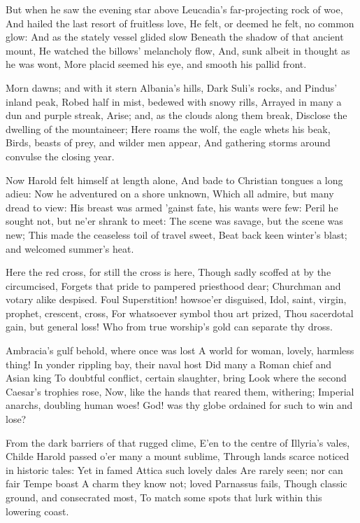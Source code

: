 \documentclass[10pt,twocolumn]{book}
\begin{document}
   But when he saw the evening star above
   Leucadia's far-projecting rock of woe,
   And hailed the last resort of fruitless love,
   He felt, or deemed he felt, no common glow:
   And as the stately vessel glided slow
   Beneath the shadow of that ancient mount,
   He watched the billows' melancholy flow,
   And, sunk albeit in thought as he was wont,
More placid seemed his eye, and smooth his pallid front.


   Morn dawns; and with it stern Albania's hills,
   Dark Suli's rocks, and Pindus' inland peak,
   Robed half in mist, bedewed with snowy rills,
   Arrayed in many a dun and purple streak,
   Arise; and, as the clouds along them break,
   Disclose the dwelling of the mountaineer;
   Here roams the wolf, the eagle whets his beak,
   Birds, beasts of prey, and wilder men appear,
And gathering storms around convulse the closing year.


   Now Harold felt himself at length alone,
   And bade to Christian tongues a long adieu:
   Now he adventured on a shore unknown,
   Which all admire, but many dread to view:
   His breast was armed 'gainst fate, his wants were few:
   Peril he sought not, but ne'er shrank to meet:
   The scene was savage, but the scene was new;
   This made the ceaseless toil of travel sweet,
Beat back keen winter's blast; and welcomed summer's heat.


   Here the red cross, for still the cross is here,
   Though sadly scoffed at by the circumcised,
   Forgets that pride to pampered priesthood dear;
   Churchman and votary alike despised.
   Foul Superstition! howsoe'er disguised,
   Idol, saint, virgin, prophet, crescent, cross,
   For whatsoever symbol thou art prized,
   Thou sacerdotal gain, but general loss!
Who from true worship's gold can separate thy dross.


   Ambracia's gulf behold, where once was lost
   A world for woman, lovely, harmless thing!
   In yonder rippling bay, their naval host
   Did many a Roman chief and Asian king
   To doubtful conflict, certain slaughter, bring
   Look where the second Caesar's trophies rose,
   Now, like the hands that reared them, withering;
   Imperial anarchs, doubling human woes!
God! was thy globe ordained for such to win and lose?


   From the dark barriers of that rugged clime,
   E'en to the centre of Illyria's vales,
   Childe Harold passed o'er many a mount sublime,
   Through lands scarce noticed in historic tales:
   Yet in famed Attica such lovely dales
   Are rarely seen; nor can fair Tempe boast
   A charm they know not; loved Parnassus fails,
   Though classic ground, and consecrated most,
To match some spots that lurk within this lowering coast.
\end{document}
